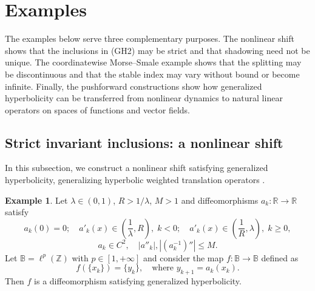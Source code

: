 \documentclass[12pt]{article}
\newcommand{\Bb}{\mathbb{B}}
\newcommand{\Zz}{\mathbb{Z}}
\newcommand{\Rr}{\mathbb{R}}
\theoremstyle{definition}
\newtheorem{example}[thm]{Example}
\begin{document}
\section{Examples}\label{sec:Examples}

The examples below serve three complementary purposes. 
The nonlinear shift shows that the inclusions in {\rm(GH2)} may be strict and that shadowing need not be unique. 
The coordinatewise Morse--Smale example shows that the splitting may be discontinuous and that the stable index may vary without bound or become infinite. 
Finally, the pushforward constructions show how generalized hyperbolicity can be transferred from nonlinear dynamics to natural linear operators on spaces of functions and vector fields.

\subsection{Strict invariant inclusions: a nonlinear shift}
In this subsection, we construct a nonlinear shift satisfying generalized hyperbolicity, generalizing hyperbolic weighted translation operators \cite{Puj18,Puj21,LatushkinRandolph1995}.
\begin{example}\label{ex:shift}
    Let $\lambda \in (0, 1)$, $R > 1/\lambda$, $M > 1$  and diffeomorphisms $a_k: \Rr \to \Rr$ satisfy 
\begin{equation}\label{eq:shift-ak}
    a_k(0) = 0; \quad 
    a'_k(x) \in \left(\frac{1}{\lambda}, R\right), \; k < 0; \quad
    a'_k(x) \in \left(\frac{1}{R}, \lambda\right), \; k \geq 0,    
\end{equation}
\begin{equation}\label{eq:shift-akc2}
a_k \in C^2, \quad |a''_k|, |(a^{-1}_k)''| \leq M.
\end{equation}
Let $\Bb = \ell^p(\Zz)$ with $p \in [1, +\infty]$ and consider the map $f: \Bb \to \Bb$ defined as
$$
f(\{x_k\}) = \{y_k\}, \quad \mbox{where $y_{k+1} = a_k(x_k)$}.
$$
Then $f$ is a diffeomorphism satisfying generalized hyperbolicity.
\end{example}
\end{document}
